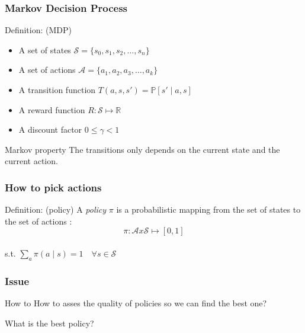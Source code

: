 \documentclass[dvipsnames,svgnames]{beamer}
\begin{document}
\begin{frame}
\frametitle{Markov Decision Process}
\begin{block}{Definition: (MDP) }
\begin{itemize}
\item A set of states $\mathcal{S}=\{s_0,s_1,s_2,\ldots,s_{n}\}$
\item A set of actions $\mathcal{A}=\{a_1,a_2,a_3,\ldots,a_{k}\}$
\item A transition function $T(a,s,s') = \mathbb{P}[s'\mid a,s]$
\item A reward function $R: \mathcal{S}\mapsto \mathbb{R}$
\item A discount factor $0 \leq \gamma < 1$ 
\end{itemize}
\end{block}

\begin{block}{Markov property}
The transitions only depends on the current state and the current action.
\end{block}
\end{frame}

%





\begin{frame}
\frametitle{How to pick actions}
\begin{block}{Definition: (policy)}
A \emph{policy} $\pi$ is a probabilistic mapping from the set of states to the set of actions : 
$$ \pi : \mathcal{A} x \mathcal{S} \mapsto [0,1] $$
\\
s.t. $\underset{a}{\sum } \pi(a\mid s)=1 \quad \forall s \in \mathcal{S}$

\end{block}
\end{frame}

\begin{frame}
\frametitle{Issue}
\begin{alertblock}{How to}
How to asses the quality of policies so we can find the best one? 

What is the best policy?
\end{alertblock}
\end{frame}
\end{document}
